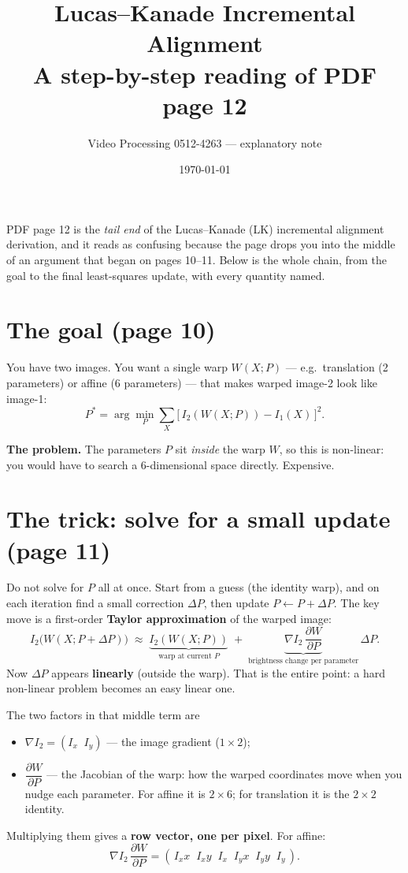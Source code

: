 \documentclass[11pt]{article}
\title{\textbf{Lucas--Kanade Incremental Alignment}\\[2pt]
\large A step-by-step reading of PDF page 12}
\author{Video Processing 0512-4263 --- explanatory note}
\date{\today}
\newcommand{\dP}{\Delta P}
\begin{document}
\maketitle

\noindent
PDF page 12 is the \emph{tail end} of the Lucas--Kanade (LK) incremental
alignment derivation, and it reads as confusing because the page drops you into
the middle of an argument that began on pages 10--11. Below is the whole chain,
from the goal to the final least-squares update, with every quantity named.

\section*{The goal (page 10)}

You have two images. You want a single warp $W(X;P)$ --- e.g.\ translation
(2 parameters) or affine (6 parameters) --- that makes warped image-2 look like
image-1:
\[
  P^* = \arg\min_P \sum_X \big[\,I_2(W(X;P)) - I_1(X)\,\big]^2 .
\]

\textbf{The problem.} The parameters $P$ sit \emph{inside} the warp $W$, so this
is non-linear: you would have to search a 6-dimensional space directly.
Expensive.

\section*{The trick: solve for a small update (page 11)}

Do not solve for $P$ all at once. Start from a guess (the identity warp), and on
each iteration find a small correction $\dP$, then update $P \leftarrow P + \dP$.
The key move is a first-order \textbf{Taylor approximation} of the warped image:
\[
  I_2\big(W(X;P+\dP)\big)\;\approx\;
  \underbrace{I_2(W(X;P))}_{\text{warp at current }P}
  \;+\;
  \underbrace{\nabla I_2 \,\frac{\partial W}{\partial P}}_{\text{brightness change per parameter}}\,\dP .
\]
Now $\dP$ appears \textbf{linearly} (outside the warp). That is the entire point:
a hard non-linear problem becomes an easy linear one.

The two factors in that middle term are
\begin{itemize}[topsep=2pt,itemsep=1pt]
  \item $\nabla I_2 = (I_x\;\; I_y)$ --- the image gradient ($1\times 2$);
  \item $\dfrac{\partial W}{\partial P}$ --- the Jacobian of the warp: how the
        warped coordinates move when you nudge each parameter. For affine it is
        $2\times 6$; for translation it is the $2\times 2$ identity.
\end{itemize}
Multiplying them gives a \textbf{row vector, one per pixel}. For affine:
\[
  \nabla I_2 \,\frac{\partial W}{\partial P}
  = (\,I_x x \;\; I_x y \;\; I_x \;\; I_y x \;\; I_y y \;\; I_y\,).
\]
\end{document}
